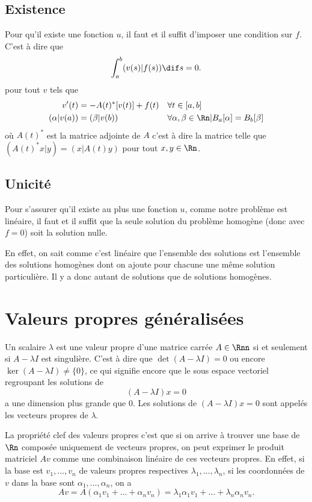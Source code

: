\subsection{Existence}
Pour qu'il existe une fonction $u$,
il faut et il suffit d'imposer une condition sur $f$.
C'est à dire que
\[ \int_a^b (v(s)|f(s)) \dif s = 0. \]
pour tout $v$ tels que
\begin{align*}
  v'(t) & = -A(t)^*[v(t)] + f(t) && \forall t \in [a,b]\\
  (\alpha|v(a)) & = (\beta|v(b)) &&
  \forall \alpha,\beta \in \Rn | B_a[\alpha] = B_b[\beta]
\end{align*}
où $A(t)^*$ est la  matrice adjointe de $A$ c'est à dire la matrice telle
que $(A(t)^*x|y) = (x|A(t)y)$ pour tout $x,y \in \Rn$.

\subsection{Unicité}
Pour s'assurer qu'il existe au plus une fonction $u$,
comme notre problème est linéaire,
il faut et il suffit que la seule solution
du problème homogène (donc avec $f = 0$)
soit la solution nulle.

En effet,
on sait comme c'est linéaire que l'ensemble des solutions
est l'ensemble des solutions homogènes dont on ajoute
pour chacune une même solution particulière.
Il y a donc autant de solutions que de solutions homogènes.

\annexe

\section{Valeurs propres généralisées}
\label{ann:vpg}
Un scalaire $\lambda$ est une valeur propre d'une matrice carrée $A \in \Rnn$
si et seulement si $A - \lambda I$ est singulière.
C'est à dire que $\det(A-\lambda I) = 0$ ou encore
$\ker(A - \lambda I) \neq \{0\}$, ce qui signifie encore que
le sous espace vectoriel regroupant les solutions de
\[ (A - \lambda I)x = 0 \]
a une dimension plus grande que 0.
Les solutions de $(A - \lambda I)x = 0$ sont appelés les vecteurs propres
de $\lambda$.

La propriété clef des valeurs propres c'est que si on arrive
à trouver une base de $\Rn$ composée uniquement de vecteurs propres,
on peut exprimer le produit matriciel $Av$ comme une combinaison linéaire
de ces vecteurs propres.
En effet, si la base est $v_1, \dots, v_n$ de valeurs propres respectives
$\lambda_1, \dots, \lambda_n$,
si les coordonnées de $v$ dans la base sont $\alpha_1, \dots, \alpha_n$,
on a
\[ Av = A(\alpha_1v_1 + \dots + \alpha_nv_n) =
\lambda_1\alpha_1v_1 + \dots + \lambda_n\alpha_nv_n. \]

